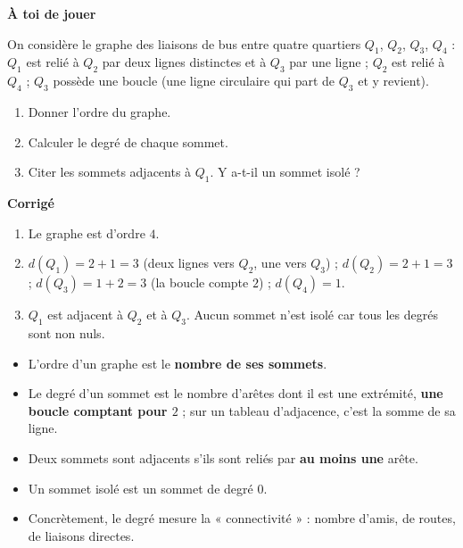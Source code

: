 \documentclass[11pt]{article}
\newcommand{\cle}[1]{{\popxbold\color{popdark}#1}}
\begin{document}
\textbf{À toi de jouer}\par

\begin{exercice}
On considère le graphe des liaisons de bus entre quatre quartiers $Q_1$, $Q_2$, $Q_3$, $Q_4$ : $Q_1$ est relié à $Q_2$ par deux lignes distinctes et à $Q_3$ par une ligne ; $Q_2$ est relié à $Q_4$ ; $Q_3$ possède une boucle (une ligne circulaire qui part de $Q_3$ et y revient).
\begin{enumerate}
\item Donner l'ordre du graphe.
\item Calculer le degré de chaque sommet.
\item Citer les sommets adjacents à $Q_1$. Y a-t-il un sommet isolé ?
\end{enumerate}
\end{exercice}

\textbf{Corrigé}\par

\begin{corrige}[Exercice]
\begin{enumerate}
\item Le graphe est d'ordre $4$.
\item $d(Q_1) = 2 + 1 = 3$ (deux lignes vers $Q_2$, une vers $Q_3$) ; $d(Q_2) = 2 + 1 = 3$ ; $d(Q_3) = 1 + 2 = 3$ (la boucle compte $2$) ; $d(Q_4) = 1$.
\item $Q_1$ est adjacent à $Q_2$ et à $Q_3$. Aucun sommet n'est isolé car tous les degrés sont non nuls.
\end{enumerate}
\end{corrige}

\begin{aretenir}
\begin{itemize}
\item L'\cle{ordre} d'un graphe est le \textbf{nombre de ses sommets}.
\item Le \cle{degré} d'un sommet est le nombre d'arêtes dont il est une extrémité, \textbf{une boucle comptant pour $2$} ; sur un tableau d'adjacence, c'est la somme de sa ligne.
\item Deux sommets sont \cle{adjacents} s'ils sont reliés par \textbf{au moins une} arête.
\item Un sommet \cle{isolé} est un sommet de degré $0$.
\item Concrètement, le degré mesure la « connectivité » : nombre d'amis, de routes, de liaisons directes.
\end{itemize}
\end{aretenir}
\end{document}
